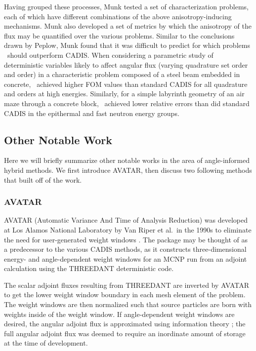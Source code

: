 Having grouped these processes, Munk tested a set of characterization problems, each
of which have different combinations of the above anisotropy-inducing mechanisms. Munk
also developed a set of metrics by which the anisotropy of the flux may be quantified
over the various problems. Similar to the conclusions drawn by Peplow, Munk found 
that it was difficult to predict for which problems \co\ should outperform CADIS. When
considering a parametric study of deterministic variables likely to affect angular 
flux (varying quadrature set order and \pn order) in a characteristic problem
composed of a steel beam embedded in concrete, \co\ achieved higher FOM values than 
standard CADIS for all quadrature and \pn orders at high energies. Similarly, for a
simple labyrinth geometry of an air maze through a concrete block, \co\ achieved lower
relative errors than did standard CADIS in the epithermal and fast neutron energy
groups.

\subsection{Other Notable Work}

Here we will briefly summarize other notable works in the area of angle-informed 
hybrid methods. We first introduce AVATAR, then discuss two following methods that
built off of the work.

\subsubsection{AVATAR}

AVATAR (Automatic Variance And Time of Analysis Reduction) was developed at Los Alamos
National Laboratory by Van Riper et al.\ in the 1990s to eliminate the need for
user-generated weight windows \cite{avatar}. The package may be thought of as a
predecessor to the various CADIS methods, as it constructs three-dimensional energy-
and angle-dependent weight windows for an MCNP run from an adjoint calculation using
the THREEDANT \cite{threedant} deterministic code.

The scalar adjoint fluxes resulting from THREEDANT are inverted by AVATAR to get the
lower weight window boundary in each mesh element of the problem. The weight windows
are then normalized such that source particles are born with weights inside of the
weight window. If angle-dependent weight windows are desired, the angular adjoint flux
is approximated using information theory \cite{avatar}; the full angular adjoint flux
was deemed to require an inordinate amount of storage at the time of development.

